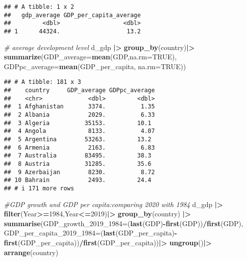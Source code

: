 \documentclass[
]{article}
\newenvironment{Shaded}{\begin{snugshade}}{\end{snugshade}}
\newcommand{\AttributeTok}[1]{\textcolor[rgb]{0.13,0.29,0.53}{#1}}
\newcommand{\CommentTok}[1]{\textcolor[rgb]{0.56,0.35,0.01}{\textit{#1}}}
\newcommand{\ConstantTok}[1]{\textcolor[rgb]{0.56,0.35,0.01}{#1}}
\newcommand{\DecValTok}[1]{\textcolor[rgb]{0.00,0.00,0.81}{#1}}
\newcommand{\FunctionTok}[1]{\textcolor[rgb]{0.13,0.29,0.53}{\textbf{#1}}}
\newcommand{\NormalTok}[1]{#1}
\newcommand{\SpecialCharTok}[1]{\textcolor[rgb]{0.81,0.36,0.00}{\textbf{#1}}}
\begin{document}
\begin{verbatim}
## # A tibble: 1 x 2
##   gdp_average GDP_per_capita_average
##         <dbl>                  <dbl>
## 1      44324.                   13.2
\end{verbatim}

\begin{Shaded}
\begin{Highlighting}[]
\CommentTok{\# average development level}
\NormalTok{d\_gdp }\SpecialCharTok{|\textgreater{}}
  \FunctionTok{group\_by}\NormalTok{(country)}\SpecialCharTok{|\textgreater{}}
  \FunctionTok{summarize}\NormalTok{(}\AttributeTok{GDP\_average=}\FunctionTok{mean}\NormalTok{(GDP,}\AttributeTok{na.rm=}\ConstantTok{TRUE}\NormalTok{),}
            \AttributeTok{GDPpc\_average=}\FunctionTok{mean}\NormalTok{(GDP\_per\_capita, }\AttributeTok{na.rm=}\ConstantTok{TRUE}\NormalTok{))}
\end{Highlighting}
\end{Shaded}

\begin{verbatim}
## # A tibble: 181 x 3
##    country     GDP_average GDPpc_average
##    <chr>             <dbl>         <dbl>
##  1 Afghanistan       3374.          1.35
##  2 Albania           2029.          6.33
##  3 Algeria          35153.         10.1 
##  4 Angola            8133.          4.07
##  5 Argentina        53263.         13.2 
##  6 Armenia           2163.          6.83
##  7 Australia        83495.         38.3 
##  8 Austria          31285.         35.6 
##  9 Azerbaijan        8230.          8.72
## 10 Bahrain           2493.         24.4 
## # i 171 more rows
\end{verbatim}

\begin{Shaded}
\begin{Highlighting}[]
\CommentTok{\#GDP growth and GDP per capita:comparing 2020 with 1984}
\NormalTok{d\_gdp }\SpecialCharTok{|\textgreater{}}
  \FunctionTok{filter}\NormalTok{(Year}\SpecialCharTok{\textgreater{}=}\DecValTok{1984}\NormalTok{,Year}\SpecialCharTok{\textless{}=}\DecValTok{2019}\NormalTok{)}\SpecialCharTok{|\textgreater{}}
  \FunctionTok{group\_by}\NormalTok{(country) }\SpecialCharTok{|\textgreater{}}
  \FunctionTok{summarise}\NormalTok{(}\AttributeTok{GDP\_growth\_2019\_1984=}\NormalTok{(}\FunctionTok{last}\NormalTok{(GDP)}\SpecialCharTok{{-}}\FunctionTok{first}\NormalTok{(GDP))}\SpecialCharTok{/}\FunctionTok{first}\NormalTok{(GDP),}
            \AttributeTok{GDP\_per\_capita\_2019\_1984=}\NormalTok{(}\FunctionTok{last}\NormalTok{(GDP\_per\_capita)}\SpecialCharTok{{-}}\FunctionTok{first}\NormalTok{(GDP\_per\_capita))}\SpecialCharTok{/}\FunctionTok{first}\NormalTok{(GDP\_per\_capita))}\SpecialCharTok{|\textgreater{}}
  \FunctionTok{ungroup}\NormalTok{()}\SpecialCharTok{|\textgreater{}}
  \FunctionTok{arrange}\NormalTok{(country)}
\end{Highlighting}
\end{Shaded}
\end{document}
